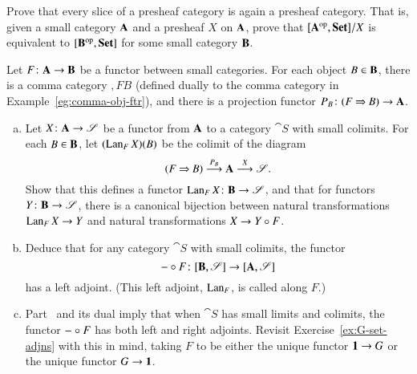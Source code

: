 \begin{question}
Prove that every slice%
%
%
%
of a presheaf category is again a presheaf category.
That is, given a small category $\mathbf{A}$ and a presheaf $X$ on $\mathbf{A}$,
prove that $[\mathbf{A}^{\mathrm{op}},\mathbf{Set}]/X$ is equivalent to $[\mathbf{B}^{\mathrm{op}},\mathbf{Set}]$ for some
small category $\mathbf{B}$.
\end{question}


\begin{question}
\label{ex:kan}
Let $F\from \scat{A} \to \scat{B}$ be a functor between small categories.
For each object $B \in \mathbf{B}$, there is a comma category $\comma{F}{B}$
(defined dually to the comma category in Example~\ref{eg:comma-obj-ftr}),
and there is a projection functor $P_B \from \comma{F}{B} \to \scat{A}$.
% 
\begin{enumerate}[(b)]
\item 
Let $X \from \scat{A} \to \cat{S}$ be a functor from $\mathbf{A}$ to a
category $\cat{S}$ with small colimits.  For each $B \in \mathbf{B}$, let
$(\operatorname{Lan}_F X)(B)$ be the colimit of the diagram
\[
(F \mathbin{\Rightarrow} B) \stackrel{P_B}{\longrightarrow} \mathbf{A} \stackrel{X}{\longrightarrow} \mathscr{S}.
\]
Show that this defines a functor $\Lan_F X\from \scat{B} \to \cat{S}$, and
that for functors $Y \from \scat{B} \to \cat{S}$, there is a canonical
bijection between natural transformations $\operatorname{Lan}_F X \to Y$ and natural
transformations $X \to Y \mathbin{\circ} F$.

\item
\label{part:left-kan-exists}
Deduce that for any category $\cat{S}$ with small colimits, the functor
\[
\dashbk \of F \from 
\ftrcat{\scat{B}}{\cat{S}} \to
\ftrcat{\scat{A}}{\cat{S}}
\]
has a left adjoint.  (This left adjoint, $\operatorname{Lan}_F$, is called
 along $F$.)

\item
Part~ and its dual imply that when $\cat{S}$
has small limits and colimits, the functor $- \mathbin{\circ} F$ has both left
and right adjoints.  Revisit Exercise~\ref{ex:G-set-adjns} with this
in mind, taking $F$ to be either the unique functor $\mathbf{1} \to G$%
%
%
%
%
or the unique functor $G \to \mathbf{1}$.
\end{enumerate}
\end{question}



